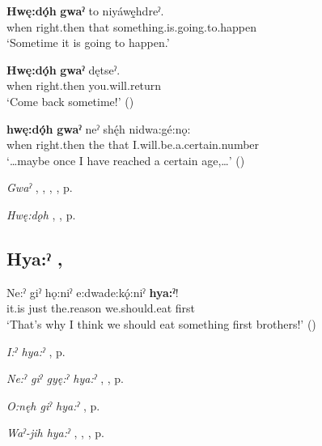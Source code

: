 \ea
\label{ex:hpar65}
\gll \textbf{Hwę:dǫ́h} \textbf{gwaˀ} to niyáwę̱hdreˀ.\\
when right.then that something.is.going.to.happen\\
\glt ‘Sometime it is going to happen.’
\z


\ea
\label{ex:hpar66}
\gll \textbf{Hwę:dǫ́h} \textbf{gwaˀ} dętseˀ.\\
when right.then you.will.return\\
\glt ‘Come back sometime!’ (\cite[39]{michelson_ontario_2011})
\z


\ea
\label{ex:hpar67}
\gll \textbf{hwę:dǫ́h} \textbf{gwaˀ} neˀ shę́h nidwa:gé:nǫ:\\
when right.then the that I.will.be.a.certain.number\\
\glt ‘…maybe once I have reached a certain age,…’ (\cite{henry_de_2005})
\z


\begin{CayugaRelated}
\item \textit{Gwaˀ} , , , , p. \pageref{p:[gwaˀ] ‘immediately’}\\
\item \textit{Hwę:dǫh} , , p. \pageref{p:[hwę:dǫh]}
\end{CayugaRelated}

\subsection*{\textbf{Hya:ˀ} , } \label{p:[hya:ˀ]}

\ea
\label{ex:hpar68}
\gll Ne:ˀ giˀ hǫ:niˀ e:dwade:kǫ́:niˀ \textbf{hya:ˀ}!\\
it.is just the.reason we.should.eat first\\
\glt ‘That’s why I think we should eat something first brothers!’ (\cite{carrier_legends_2013})
\z


\begin{CayugaRelated}
\item \textit{I:ˀ hya:ˀ} , p. \pageref{p:[i:ˀ hya:ˀ]}\\
\item \textit{Ne:ˀ giˀ gyę:ˀ hya:ˀ} , , p. \pageref{p:[ne:ˀ giˀ gyę:ˀ hya:ˀ]}\\
\item \textit{O:nęh giˀ hya:ˀ} , p. \pageref{p:[o:nęh giˀ hya:ˀ]}\\
\item \textit{Waˀ-jih hya:ˀ} , , , p. \pageref{p:[waˀ-jih hya:ˀ]}
\end{CayugaRelated}

